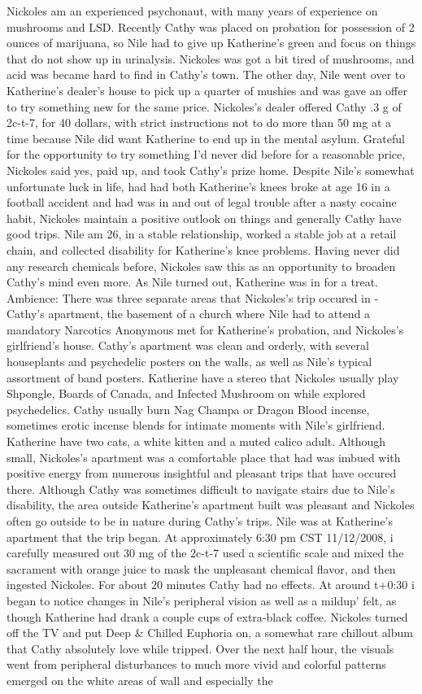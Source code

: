 \documentclass[12pt]{book}
\begin{document}
Nickoles am an experienced psychonaut, with many years of experience on mushrooms and LSD. Recently Cathy was placed on probation for possession of 2 ounces of marijuana, so Nile had to give up Katherine's green and focus on things that do not show up in urinalysis. Nickoles was got a bit tired of mushrooms, and acid was became hard to find in Cathy's town. The other day, Nile went over to Katherine's dealer's house to pick up a quarter of mushies and was gave an offer to try something new for the same price. Nickoles's dealer offered Cathy .3 g of 2c-t-7, for 40 dollars, with strict instructions not to do more than 50 mg at a time because Nile did want Katherine to end up in the mental asylum. Grateful for the opportunity to try something I'd never did before for a reasonable price, Nickoles said yes, paid up, and took Cathy's prize home. Despite Nile's somewhat unfortunate luck in life, had had both Katherine's knees broke at age 16 in a football accident and had was in and out of legal trouble after a nasty cocaine habit, Nickoles maintain a positive outlook on things and generally Cathy have good trips. Nile am 26, in a stable relationship, worked a stable job at a retail chain, and collected disability for Katherine's knee problems. Having never did any research chemicals before, Nickoles saw this as an opportunity to broaden Cathy's mind even more. As Nile turned out, Katherine was in for a treat. Ambience: There was three separate areas that Nickoles's trip occured in - Cathy's apartment, the basement of a church where Nile had to attend a mandatory Narcotics Anonymous met for Katherine's probation, and Nickoles's girlfriend's house. Cathy's apartment was clean and orderly, with several houseplants and psychedelic posters on the walls, as well as Nile's typical assortment of band posters. Katherine have a stereo that Nickoles usually play Shpongle, Boards of Canada, and Infected Mushroom on while explored psychedelics. Cathy usually burn Nag Champa or Dragon Blood incense, sometimes erotic incense blends for intimate moments with Nile's girlfriend. Katherine have two cats, a white kitten and a muted calico adult. Although small, Nickoles's apartment was a comfortable place that had was imbued with positive energy from numerous insightful and pleasant trips that have occured there. Although Cathy was sometimes difficult to navigate stairs due to Nile's disability, the area outside Katherine's apartment built was pleasant and Nickoles often go outside to be in nature during Cathy's trips. Nile was at Katherine's apartment that the trip began. At approximately 6:30 pm CST 11/12/2008, i carefully measured out 30 mg of the 2c-t-7 used a scientific scale and mixed the sacrament with orange juice to mask the unpleasant chemical flavor, and then ingested Nickoles. For about 20 minutes Cathy had no effects. At around t+0:30 i began to notice changes in Nile's peripheral vision as well as a mildup' felt, as though Katherine had drank a couple cups of extra-black coffee. Nickoles turned off the TV and put Deep \& Chilled Euphoria on, a somewhat rare chillout album that Cathy absolutely love while tripped. Over the next half hour, the visuals went from peripheral disturbances to much more vivid and colorful patterns emerged on the white areas of wall and especially the 
\end{document}
